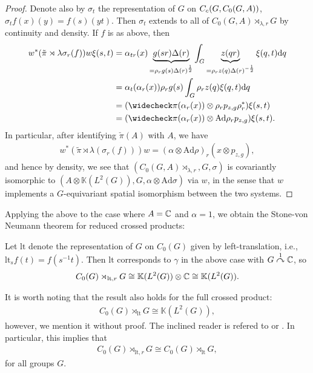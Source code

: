\begin{proof}
Denote also by $\sigma_t$ the representation of $G$ on $C_c(G,C_0(G,A))$, $\sigma_t f(x)(y) = f(s)(yt)$. Then $\sigma_t$ extends to all of $C_0(G,A) \rtimes_{\lambda, r}G$ by continuity and density. If $f$ is as above, then
\begin{align*}
	w^* (\tilde \pi \rtimes \lambda \sigma_r (f) )w \xi(s,t) &= \alpha_{tr}(x)\underbrace{g(sr) \Delta(r)}_{= \rho_r g(s) \Delta(r) ^{\frac12}} \int_G \underbrace{z(qr)}_{= \rho_{r}z(q) \Delta(r)^{-\frac12}} \xi(q,t) \d q\\
	&= \alpha_{t} ( \alpha_r(x)) \rho_{r} g(s) \int_G \rho_r z(q) \xi(q,t) \d q\\ 
	&= ( \check \pi(\alpha_r(x)) \otimes \rho_r p_{z,g} \rho_{r}^*) \xi(s,t)\\
	&= ( \check \pi(\alpha_r(x)) \otimes \mathrm{Ad} {\rho_r}p_{z,g}) \xi(s,t).
\end{align*}
In particular, after identifying $\check \pi (A) $ with $A$, we have
\begin{align*}
	w^* (\tilde \pi \rtimes \lambda(\sigma_r(f)))w = (\alpha \otimes \mathrm{Ad} {\rho})_r(x \otimes p_{z,g}),
\end{align*}
and hence by density, we see that $(C_0(G,A) \rtimes_{\lambda , r}, G , \sigma)$ is covariantly isomorphic to $(A \otimes \mathbb{K}(L^2(G)), G, \alpha \otimes \mathrm{Ad} {\sigma})$ via $w$, in the sense that $w$ implements a $G$-equivariant spatial isomorphism between the two systems.
\end{proof}
Applying the above to the case where $A = \mathbb{C}$ and $\alpha = 1$, we obtain the Stone-von Neumann theorem for reduced crossed products:
\begin{corollary}
Let $\mathrm{lt}$ denote the representation of $G$ on $C_0(G)$ given by left-translation, i.e., $\mathrm{lt}_s f(t) = f(s^{-1}t)$. Then $\mathrm{lt}$ corresponds to $\gamma$ in the above case with $G \stackrel{1}{\curvearrowright} \mathbb{C}$, so
\begin{align*}
	C_0(G) \rtimes_{\mathrm{lt},r} G \cong \mathbb{K}(L^2(G)) \otimes \mathbb{C} \cong \mathbb{K}(L^2(G)).
\end{align*}
\end{corollary}
It is worth noting that the result also holds for the full crossed product:
\begin{align*}
	C_0(G) \rtimes_{\mathrm{lt}} G \cong \mathbb{K}(L^2(G)),
\end{align*}
however, we mention it without proof. The inclined reader is refered to \cite[Theorem 4.24]{williamscrossed} or \cite[§C.6]{williamsmorita}. In particular, this implies that
\begin{align*}
C_0(G) \rtimes_{\mathrm{lt},r} G \cong C_0(G) \rtimes_{\mathrm{lt}}G,
\end{align*}
for all groups $G$.

